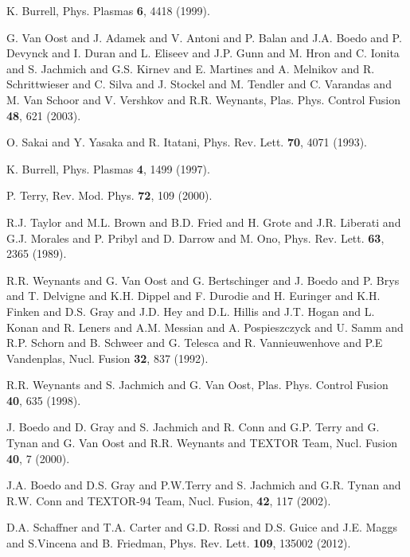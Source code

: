\documentclass[aip,pop,amsmath,amssymb,reprint,superscriptaddress]{revtex4-1} %
\begin{document}
\providecommand{\noopsort}[1]{}\providecommand{\singleletter}[1]{#1}%
\begin{thebibliography}{10}

K. Burrell, Phys. Plasmas {\bf 6},  4418  (1999).

G. Van Oost and J. Adamek and V. Antoni and P. Balan and J.A. Boedo and P. Devynck and I. Duran and L. Eliseev and J.P. Gunn and M. Hron and C. Ionita and S. Jachmich and G.S. Kirnev and E. Martines and A. Melnikov and R. Schrittwieser and C. Silva and J. Stockel and M. Tendler and C. Varandas and M. Van Schoor and V. Vershkov and R.R. Weynants, Plas. Phys. Control Fusion {\bf 48}, 621 (2003).

O. Sakai and Y. Yasaka and R. Itatani, Phys. Rev. Lett. {\bf 70},  4071 (1993).

K. Burrell, Phys. Plasmas {\bf 4},  1499  (1997).

P. Terry, Rev. Mod. Phys. {\bf 72},  109  (2000).

R.J. Taylor and M.L. Brown and B.D. Fried and H. Grote and J.R. Liberati and G.J. Morales and P. Pribyl and D. Darrow and M. Ono, Phys. Rev. Lett. {\bf 63},  2365  (1989).

R.R. Weynants and G. Van Oost and G. Bertschinger and J. Boedo and P. Brys and T. Delvigne and K.H. Dippel and F. Durodie and H. Euringer and K.H. Finken and D.S. Gray and J.D. Hey and D.L. Hillis and J.T. Hogan and L. Konan and R. Leners and A.M. Messian and A. Pospieszczyck and U. Samm and R.P. Schorn and B. Schweer and G. Telesca and R. Vannieuwenhove and P.E Vandenplas, Nucl. Fusion {\bf 32},  837  (1992).

R.R. Weynants and S. Jachmich and G. Van Oost, Plas. Phys. Control Fusion {\bf 40}, 635 (1998).

J. Boedo and D. Gray and S. Jachmich and R. Conn and G.P. Terry and G. Tynan and G. Van Oost and R.R. Weynants and TEXTOR Team, Nucl. Fusion {\bf 40},  7  (2000).

J.A. Boedo and D.S. Gray and P.W.Terry and S. Jachmich and G.R. Tynan and R.W. Conn and TEXTOR-94 Team, Nucl. Fusion, {\bf 42}, 117 (2002).

D.A. Schaffner and T.A. Carter and G.D. Rossi and D.S. Guice and J.E. Maggs and S.Vincena and B. Friedman, Phys. Rev. Lett. {\bf 109}, 135002 (2012).


\end{thebibliography}
\end{document}
